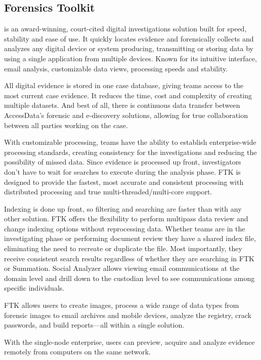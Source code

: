 \subsection{Forensics Toolkit}

 \cite{ftk}  is an award-winning, court-cited digital investigations solution built for speed, stability and ease of use. It quickly 
locates evidence and forensically collects and analyzes any digital device or system producing, transmitting or 
storing data by using a single application from multiple devices. Known for its intuitive interface, email analysis, 
customizable data views, processing speeds and stability.

All digital evidence is stored in one case database, giving teams access to the most current case evidence. It 
reduces the time, cost and complexity of creating multiple datasets. And best of all, there is continuous data transfer between AccessData's forensic 
and e-discovery solutions, allowing for true collaboration between all parties working on the case. 

With customizable processing, teams have the ability to establish enterprise-wide processing standards, creating 
consistency for the investigations and reducing the possibility of missed data. Since evidence is processed up 
front, investigators don't have to wait for searches to execute during the analysis phase. FTK is designed to provide the fastest, 
most accurate and consistent processing with distributed processing and true multi-threaded/multi-core support.

Indexing is done up front, so filtering and searching are faster than with any other solution. FTK offers 
the flexibility to perform multipass data review and change indexing options without reprocessing data. 
Whether teams are in the investigating phase or performing document review they have a shared index 
file, eliminating the need to recreate or duplicate the file. Most importantly, they receive consistent search 
results regardless of whether they are searching in FTK or Summation. Social Analyzer allows viewing email 
communications at the domain level and drill down to the custodian level to see communications among 
specific individuals. 

FTK allows users to create images, process a wide range of data types from forensic images to email archives and 
mobile devices, analyze the registry, crack passwords, and build reports—all within a single solution. 

With the single-node enterprise, users can preview, acquire and analyze evidence remotely from computers 
on the same network. 

